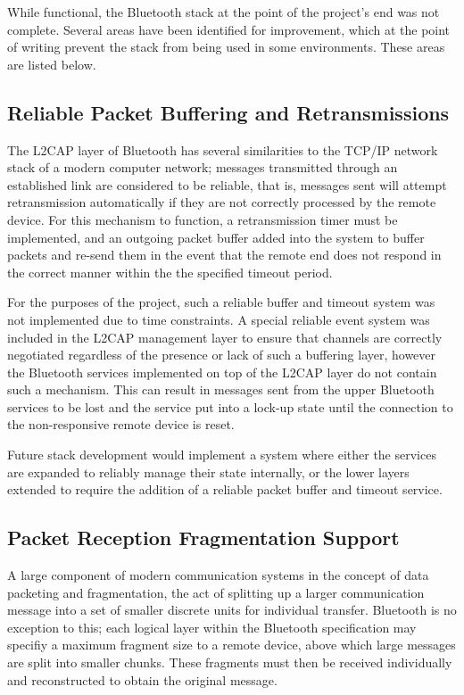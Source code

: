 While functional, the Bluetooth stack at the point of the project's end was not complete. Several areas have been identified for improvement, which at the point of writing prevent the stack from being used in some environments. These areas are listed below.

\subsection{Reliable Packet Buffering and Retransmissions}

The L2CAP layer of Bluetooth has several similarities to the TCP/IP network stack of a modern computer network; messages transmitted through an established link are considered to be reliable, that is, messages sent will attempt retransmission automatically if they are not correctly processed by the remote device. For this mechanism to function, a retransmission timer must be implemented, and an outgoing packet buffer added into the system to buffer packets and re-send them in the event that the remote end does not respond in the correct manner within the the specified timeout period.

For the purposes of the project, such a reliable buffer and timeout system was not implemented due to time constraints. A special reliable event system was included in the L2CAP management layer to ensure that channels are correctly negotiated regardless of the presence or lack of such a buffering layer, however the Bluetooth services implemented on top of the L2CAP layer do not contain such a mechanism. This can result in messages sent from the upper Bluetooth services to be lost and the service put into a lock-up state until the connection to the non-responsive remote device is reset.

Future stack development would implement a system where either the services are expanded to reliably manage their state internally, or the lower layers extended to require the addition of a reliable packet buffer and timeout service.

\subsection{Packet Reception Fragmentation Support}

A large component of modern communication systems in the concept of data packeting and fragmentation, the act of splitting up a larger communication message into a set of smaller discrete units for individual transfer. Bluetooth is no exception to this; each logical layer within the Bluetooth specification may specifiy a maximum fragment size to a remote device, above which large messages are split into smaller chunks. These fragments must then be received individually and reconstructed to obtain the original message.

